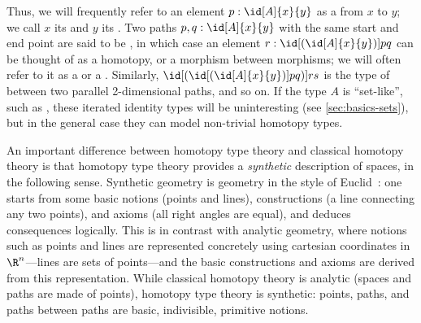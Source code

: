 Thus, we will frequently refer to an element $p : \id[A]{x}{y}$ as
a 
from $x$ to $y$; we call $x$ its 
and $y$ its .
Two paths $p,q : \id[A]{x}{y}$ with the same start and end point are said to be ,
in which case an element $r : \id[{(\id[A]{x}{y})}]{p}{q}$ can
be thought of as a homotopy, or a morphism between morphisms;
we will often refer to it as a 
%
or a .
%
%
Similarly, $\id[{(\id[{(\id[A]{x}{y})}]{p}{q})}]{r}{s}$ is the type of
%
between two parallel 2-dimensional paths, and so on.  If the
type $A$ is ``set-like'', such as \nat, these iterated identity types
will be uninteresting (see \cref{sec:basics-sets}), but in the
general case they can model non-trivial homotopy types.


An important difference between homotopy type theory and classical homotopy theory is that homotopy type theory provides a \emph{synthetic}
%
%
%
description of spaces, in the following sense. Synthetic geometry is geometry in the style of Euclid~\cite{Euclid}: one starts from some basic notions (points and lines), constructions (a line connecting any two points), and axioms
(all right angles are equal), and deduces consequences logically.  This is in contrast with analytic
%
geometry, where notions such as points and lines are represented concretely using cartesian coordinates in $\R^n$---lines are sets of points---and the basic constructions and axioms are derived from this representation.  While classical homotopy theory is analytic (spaces and paths are made of points), homotopy type theory is synthetic: points, paths, and paths between paths are basic, indivisible, primitive notions.


